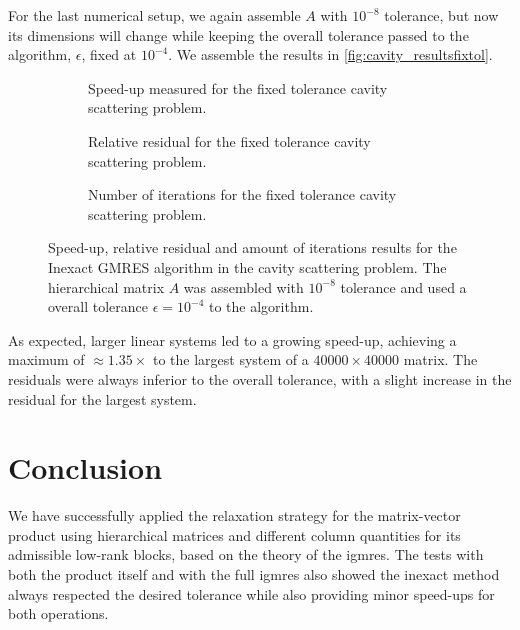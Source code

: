For the last numerical setup, we again assemble $A$ with $10^{-8}$ tolerance, but now its dimensions will change while keeping the overall tolerance passed to the algorithm, $\epsilon$, fixed at $10^{-4}$. We assemble the results in \autoref{fig:cavity_resultsfixtol}.

\begin{figure}[h!]
    \centering
    \begin{subfigure}[b]{0.6\linewidth}
        
        \caption{Speed-up measured for the fixed tolerance cavity scattering problem.}
    \end{subfigure}
    \begin{subfigure}[b]{0.4\linewidth}
        
        \caption{Relative residual for the fixed tolerance cavity scattering problem.}
    \end{subfigure}
    \begin{subfigure}[b]{0.4\linewidth}
        
        \caption{Number of iterations for the fixed tolerance cavity scattering problem.}
    \end{subfigure}
    \caption{Speed-up, relative residual and amount of iterations results for the Inexact GMRES algorithm in the cavity scattering problem. The hierarchical matrix $A$ was assembled with $10^{-8}$ tolerance and used a overall tolerance $\epsilon = 10^{-4}$ to the algorithm.}
    \label{fig:cavity_resultsfixtol}
\end{figure}

As expected, larger linear systems led to a growing speed-up, achieving a maximum of $\approx 1.35\times$ to the largest system of a $40000 \times 40000$ matrix. The residuals were always inferior to the overall tolerance, with a slight increase in the residual for the largest system.

\clearpage
\section{Conclusion}

We have successfully applied the relaxation strategy for the matrix-vector product using hierarchical matrices and different column quantities for its admissible low-rank blocks, based on the theory of the \acrfull{igmres}. The tests with both the product itself and with the full \acrshort{igmres} also showed the inexact method always respected the desired tolerance while also providing minor speed-ups for both operations.

